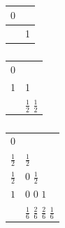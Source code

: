 \begin{table}[!htb]
	\begin{minipage}{.33\linewidth}
		\caption{}
		\centering
		\begin{tabular}{c|l}
			$0$ &  \\
			\hline
			& 1
		\end{tabular}
	\end{minipage}%
	\begin{minipage}{.33\linewidth}
		\centering
		\caption{}
		\begin{tabular}{c|l}
			$0$ &  \\
			1 & 1  \\
			\hline
			& $\frac{1}{2}$ $\frac{1}{2}$
		\end{tabular}
	\end{minipage} %
    \begin{minipage}{.33\linewidth}
    	\caption{}
    	\centering
    	\begin{tabular}{c|l}
    		$0$ &  \\
    		$\frac{1}{2}$ & $\frac{1}{2}$ \\
    		$\frac{1}{2}$ & $0$ $\frac{1}{2}$\\
    		$1$ & $0$ $0$ $1$            \\
    		\hline
    		& $\frac{1}{6}$ $\frac{2}{6}$ $\frac{2}{6}$ $\frac{1}{6}$
    	\end{tabular}
    \end{minipage}
\end{table}

